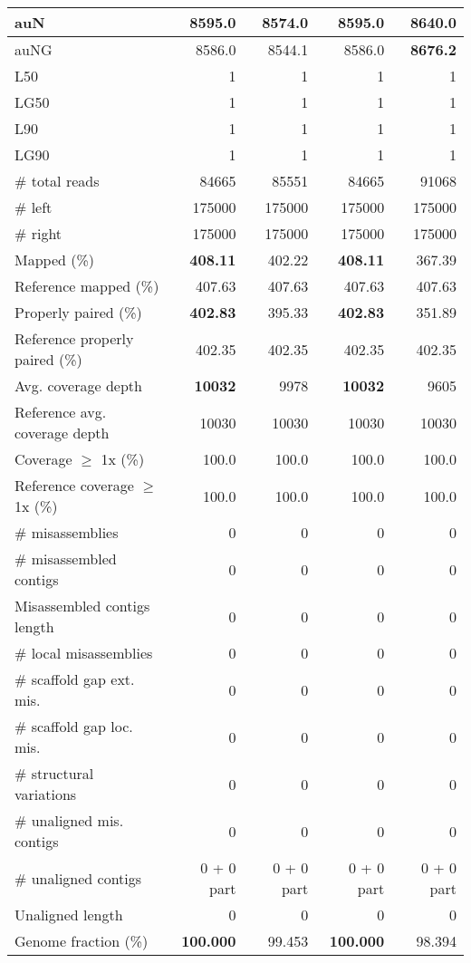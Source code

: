 \documentclass[12pt,a4paper]{article}
\begin{document}
\begin{table}[ht]
\begin{center}
\begin{tabular}{|l*{4}{|r}|}
auN & 8595.0 & 8574.0 & 8595.0 & {\bf 8640.0} \\ \hline
auNG & 8586.0 & 8544.1 & 8586.0 & {\bf 8676.2} \\ \hline
L50 & 1 & 1 & 1 & 1 \\ \hline
LG50 & 1 & 1 & 1 & 1 \\ \hline
L90 & 1 & 1 & 1 & 1 \\ \hline
LG90 & 1 & 1 & 1 & 1 \\ \hline
\# total reads & 84665 & 85551 & 84665 & 91068 \\ \hline
\# left & 175000 & 175000 & 175000 & 175000 \\ \hline
\# right & 175000 & 175000 & 175000 & 175000 \\ \hline
Mapped (\%) & {\bf 408.11} & 402.22 & {\bf 408.11} & 367.39 \\ \hline
Reference mapped (\%) & 407.63 & 407.63 & 407.63 & 407.63 \\ \hline
Properly paired (\%) & {\bf 402.83} & 395.33 & {\bf 402.83} & 351.89 \\ \hline
Reference properly paired (\%) & 402.35 & 402.35 & 402.35 & 402.35 \\ \hline
Avg. coverage depth & {\bf 10032} & 9978 & {\bf 10032} & 9605 \\ \hline
Reference avg. coverage depth & 10030 & 10030 & 10030 & 10030 \\ \hline
Coverage $\geq$ 1x (\%) & 100.0 & 100.0 & 100.0 & 100.0 \\ \hline
Reference coverage $\geq$ 1x (\%) & 100.0 & 100.0 & 100.0 & 100.0 \\ \hline
\# misassemblies & 0 & 0 & 0 & 0 \\ \hline
\# misassembled contigs & 0 & 0 & 0 & 0 \\ \hline
Misassembled contigs length & 0 & 0 & 0 & 0 \\ \hline
\# local misassemblies & 0 & 0 & 0 & 0 \\ \hline
\# scaffold gap ext. mis. & 0 & 0 & 0 & 0 \\ \hline
\# scaffold gap loc. mis. & 0 & 0 & 0 & 0 \\ \hline
\# structural variations & 0 & 0 & 0 & 0 \\ \hline
\# unaligned mis. contigs & 0 & 0 & 0 & 0 \\ \hline
\# unaligned contigs & 0 + 0 part & 0 + 0 part & 0 + 0 part & 0 + 0 part \\ \hline
Unaligned length & 0 & 0 & 0 & 0 \\ \hline
Genome fraction (\%) & {\bf 100.000} & 99.453 & {\bf 100.000} & 98.394 \\ \hline

\end{tabular}
\end{center}
\end{table}
\end{document}
